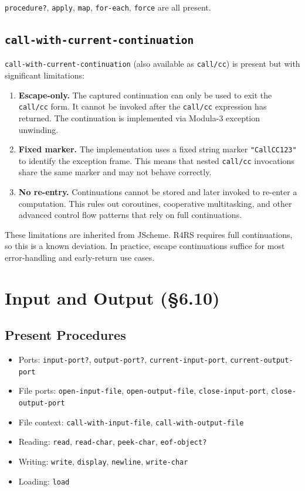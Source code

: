 \documentclass[12pt]{report}
\begin{document}
{\tt procedure?}, {\tt apply}, {\tt map}, {\tt for-each}, {\tt force}
are all present.

\subsection{{\tt call-with-current-continuation}}

{\tt call-with-current-continuation} (also available as {\tt call/cc})
is present but with significant limitations:

\begin{enumerate}
\item \textbf{Escape-only.}  The captured continuation can only be used
  to exit the {\tt call/cc} form.  It cannot be invoked after the
  {\tt call/cc} expression has returned.  The continuation is
  implemented via Modula-3 exception unwinding.

\item \textbf{Fixed marker.}  The implementation uses a fixed string
  marker {\tt "CallCC123"} to identify the exception frame.  This
  means that nested {\tt call/cc} invocations share the same marker
  and may not behave correctly.

\item \textbf{No re-entry.}  Continuations cannot be stored and later
  invoked to re-enter a computation.  This rules out coroutines,
  cooperative multitasking, and other advanced control flow patterns
  that rely on full continuations.
\end{enumerate}

\noindent
These limitations are inherited from JScheme.  R4RS requires full
continuations, so this is a known deviation.  In practice, escape
continuations suffice for most error-handling and early-return use
cases.

\section{Input and Output (\S6.10)}

\subsection{Present Procedures}

\begin{itemize}[nosep]
\item Ports: {\tt input-port?}, {\tt output-port?},
  {\tt current-input-port}, {\tt current-output-port}
\item File ports: {\tt open-input-file}, {\tt open-output-file},
  {\tt close-input-port}, {\tt close-output-port}
\item File context: {\tt call-with-input-file}, {\tt call-with-output-file}
\item Reading: {\tt read}, {\tt read-char}, {\tt peek-char},
  {\tt eof-object?}
\item Writing: {\tt write}, {\tt display}, {\tt newline}, {\tt write-char}
\item Loading: {\tt load}
\end{itemize}
\end{document}
